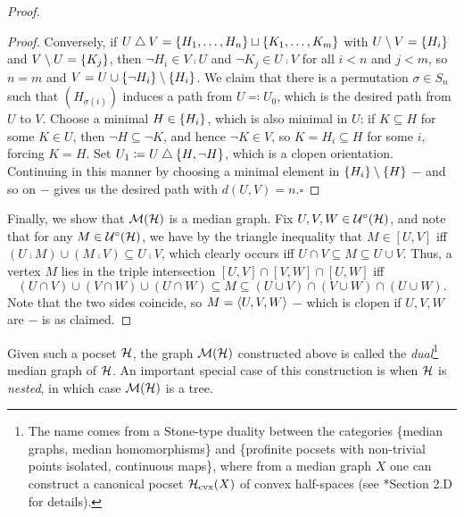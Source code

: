 \documentclass[reqno]{amsart}
\begin{document}
\begin{proof}
\begin{center}
\begin{minipage}{0.95\textwidth}
\begin{proof}
                    \hspace{0.2in}Conversely, if $U\bigtriangleup V=\left\{H_1,\dots,H_n\right\}\sqcup\left\{K_1,\dots,K_m\right\}$ with $U\setminus V=\left\{H_i\right\}$ and $V\setminus U=\left\{K_j\right\}$, then $\lnot H_i\in V\comp U$ and $\lnot K_j\in U\comp V$ for all $i<n$ and $j<m$, so $n=m$ and $V=U\cup\left\{\lnot H_i\right\}\setminus\left\{H_i\right\}$. We claim that there is a permutation $\sigma\in S_n$ such that $(H_{\sigma(i)})$ induces a path from $U\eqqcolon U_0$, which is the desired path from $U$ to $V$. Choose a minimal $H\in\left\{H_i\right\}$, which is also minimal in $U$: if $K\subseteq H$ for some $K\in U$, then $\lnot H\subseteq\lnot K$, and hence $\lnot K\in V$, so $K=H_i\subseteq H$ for some $i$, forcing $K=H$. Set $U_1\coloneqq U\bigtriangleup\left\{H,\lnot H\right\}$, which is a clopen orientation. Continuing in this manner by choosing a minimal element in $\left\{H_i\right\}\setminus\left\{H\right\}$ $-$ and so on $-$ gives us the desired path with $d(U,V)=n$.\phantom\qedhere\hfill$\square$
                \end{proof}
            \end{minipage}
        \end{center}
        Finally, we show that $\mathcal{M}(\mathcal{H})$ is a median graph. Fix $U,V,W\in\mathcal{U}^\circ(\mathcal{H})$, and note that for any $M\in\mathcal{U}^\circ(\mathcal{H})$, we have by the triangle inequality that $M\in[U,V]$ iff $(U\comp M)\cup(M\comp V)\subseteq U\comp V$, which clearly occurs iff $U\cap V\subseteq M\subseteq U\cup V$. Thus, a vertex $M$ lies in the triple intersection $[U,V]\cap[V,W]\cap[U,W]$ iff
        \begin{equation*}
            (U\cap V)\cup(V\cap W)\cup(U\cap W)\subseteq M\subseteq(U\cup V)\cap(V\cup W)\cap(U\cup W).
        \end{equation*}
        Note that the two sides coincide, so $M=\left\langle U,V,W\right\rangle$ $-$ which is clopen if $U,V,W$ are $-$ is as claimed.
    \end{proof}

    Given such a pocset $\mathcal{H}$, the graph $\mathcal{M}(\mathcal{H})$ constructed above is called the \textit{dual}\footnote{The name comes from a Stone-type duality between the categories \{median graphs, median homomorphisms\} and \{profinite pocsets with non-trivial points isolated, continuous maps\}, where from a median graph $X$ one can construct a canonical pocset $\mathcal{H}_\mathrm{cvx}(X)$ of convex half-spaces (see \cite{CPTT23}*{Section 2.D} for details).} median graph of $\mathcal{H}$. An important special case of this construction is when $\mathcal{H}$ is \textit{nested}, in which case $\mathcal{M}(\mathcal{H})$ is a tree.
\end{document}
